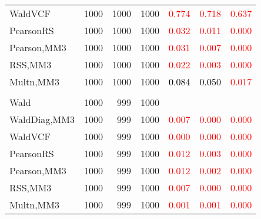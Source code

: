 \documentclass[
]{article}
\begin{document}
\begin{table}[H]
{\begin{tabular}[t]{lrrrrrr}
\hspace{1em}WaldVCF & 1000 & 1000 & 1000 & \textcolor{red}{0.774} & \textcolor{red}{0.718} & \textcolor{red}{0.637}\\
\hspace{1em}PearsonRS & 1000 & 1000 & 1000 & \textcolor{red}{0.032} & \textcolor{red}{0.011} & \textcolor{red}{0.000}\\
\hspace{1em}Pearson,MM3 & 1000 & 1000 & 1000 & \textcolor{red}{0.031} & \textcolor{red}{0.007} & \textcolor{red}{0.000}\\
\hspace{1em}RSS,MM3 & 1000 & 1000 & 1000 & \textcolor{red}{0.022} & \textcolor{red}{0.003} & \textcolor{red}{0.000}\\
\hspace{1em}Multn,MM3 & 1000 & 1000 & 1000 & \textcolor{black}{0.084} & \textcolor{black}{0.050} & \textcolor{red}{0.017}\\
\addlinespace[0.3em]
\multicolumn{7}{l}{\textbf{3F 15V}}\\
\hspace{1em}Wald & 1000 & 999 & 1000 & \textcolor{black}{} & \textcolor{black}{} & \textcolor{black}{}\\
\hspace{1em}WaldDiag,MM3 & 1000 & 999 & 1000 & \textcolor{red}{0.007} & \textcolor{red}{0.000} & \textcolor{red}{0.000}\\
\hspace{1em}WaldVCF & 1000 & 999 & 1000 & \textcolor{red}{0.000} & \textcolor{red}{0.000} & \textcolor{red}{0.000}\\
\hspace{1em}PearsonRS & 1000 & 999 & 1000 & \textcolor{red}{0.012} & \textcolor{red}{0.003} & \textcolor{red}{0.000}\\
\hspace{1em}Pearson,MM3 & 1000 & 999 & 1000 & \textcolor{red}{0.012} & \textcolor{red}{0.002} & \textcolor{red}{0.000}\\
\hspace{1em}RSS,MM3 & 1000 & 999 & 1000 & \textcolor{red}{0.007} & \textcolor{red}{0.000} & \textcolor{red}{0.000}\\
\hspace{1em}Multn,MM3 & 1000 & 999 & 1000 & \textcolor{red}{0.001} & \textcolor{red}{0.001} & \textcolor{red}{0.000}\\
\bottomrule
\end{tabular}}
\endgroup{}
\end{table}
\end{document}
